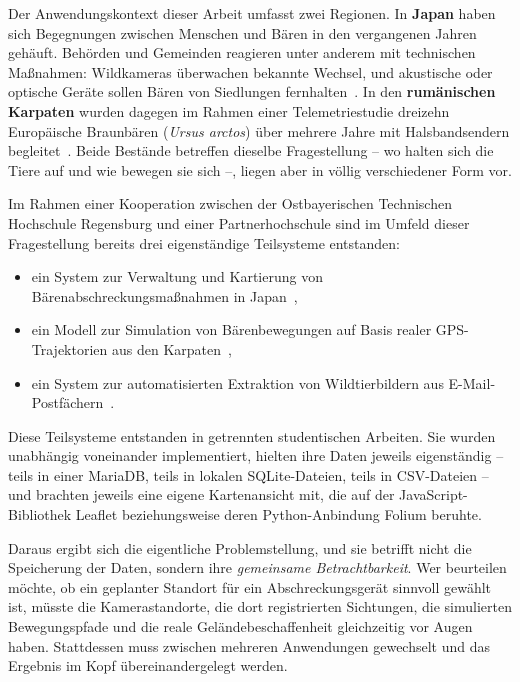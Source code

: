 \documentclass[12pt,a4paper]{scrreprt}
\begin{document}
Der Anwendungskontext dieser Arbeit umfasst zwei Regionen. In
\textbf{Japan} haben sich Begegnungen zwischen Menschen und Bären in
den vergangenen Jahren gehäuft. Behörden und Gemeinden reagieren unter
anderem mit technischen Maßnahmen: Wildkameras überwachen bekannte
Wechsel, und akustische oder optische Geräte sollen Bären von
Siedlungen fernhalten~\cite{lorenz2025}. In den \textbf{rumänischen
Karpaten} wurden dagegen im Rahmen einer Telemetriestudie dreizehn
Europäische Braunbären (\textit{Ursus arctos}) über mehrere Jahre mit
Halsbandsendern begleitet~\cite{pop2018}. Beide Bestände betreffen
dieselbe Fragestellung -- wo halten sich die Tiere auf und wie bewegen
sie sich --, liegen aber in völlig verschiedener Form vor.

Im Rahmen einer Kooperation zwischen der Ostbayerischen Technischen
Hochschule Regensburg und einer Partnerhochschule sind im Umfeld dieser
Fragestellung bereits drei eigenständige Teilsysteme entstanden:

\begin{itemize}
  \item ein System zur Verwaltung und Kartierung von
        Bärenabschreckungsmaßnahmen in Japan~\cite{lorenz2025},
  \item ein Modell zur Simulation von Bärenbewegungen auf Basis realer
        GPS-Trajektorien aus den Karpaten~\cite{braeu2025},
  \item ein System zur automatisierten Extraktion von Wildtierbildern
        aus E-Mail-Postfächern~\cite{lelchat2026}.
\end{itemize}

Diese Teilsysteme entstanden in getrennten studentischen Arbeiten. Sie
wurden unabhängig voneinander implementiert, hielten ihre Daten jeweils
eigenständig -- teils in einer MariaDB, teils in lokalen
SQLite-Dateien, teils in CSV-Dateien -- und brachten jeweils eine
eigene Kartenansicht mit, die auf der JavaScript-Bibliothek
Leaflet beziehungsweise deren Python-Anbindung Folium beruhte.

Daraus ergibt sich die eigentliche Problemstellung, und sie betrifft
nicht die Speicherung der Daten, sondern ihre \emph{gemeinsame
Betrachtbarkeit}. Wer beurteilen möchte, ob ein geplanter Standort für
ein Abschreckungsgerät sinnvoll gewählt ist, müsste die
Kamerastandorte, die dort registrierten Sichtungen, die simulierten
Bewegungspfade und die reale Geländebeschaffenheit gleichzeitig vor
Augen haben. Stattdessen muss zwischen mehreren Anwendungen gewechselt
und das Ergebnis im Kopf übereinandergelegt werden.
\end{document}
